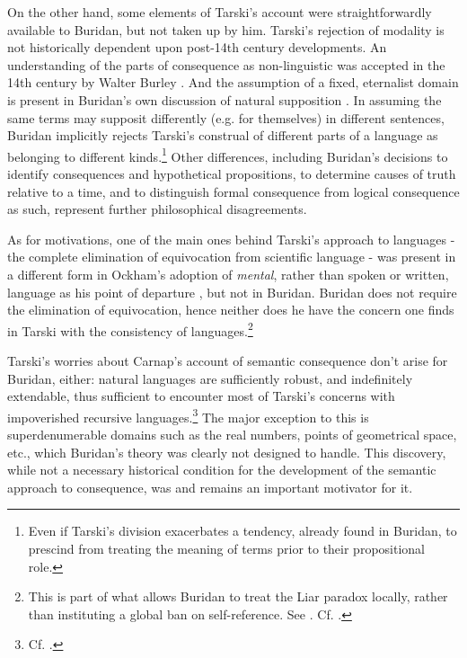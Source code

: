 \documentclass[]{article}
\begin{document}
On the other hand, some elements of Tarski's account were straightforwardly available to Buridan, but not taken up by him. Tarski's rejection of modality is not historically dependent upon post-14th century developments. An understanding of the parts of consequence as non-linguistic was accepted in the 14th century by Walter Burley \autocite{Bulthuis2016}. And the assumption of a fixed, eternalist domain is present in Buridan's own discussion of natural supposition \autocite[4.3.4]{BuridanKlimaSD}. In assuming the same terms may supposit differently (e.g. for themselves) in different sentences, Buridan implicitly rejects Tarski's construal of different parts of a language as belonging to different kinds.\footnote{Even if Tarski's division exacerbates a tendency, already found in Buridan, to prescind from treating the meaning of terms prior to their propositional role.} Other differences, including Buridan's decisions to identify consequences and hypothetical propositions, to determine causes of truth relative to a time, and to distinguish formal consequence from logical consequence as such, represent further philosophical disagreements.

As for motivations, one of the main ones behind Tarski's approach to languages - the complete elimination of equivocation from scientific language - was present in a different form in Ockham's adoption of \textit{mental}, rather than spoken or written, language as his point of departure \autocite{Trentman1970} \autocite{Spade1980} \autocite{Chalmers1999}, but not in Buridan. Buridan does not require the elimination of equivocation, hence neither does he have the concern one finds in Tarski with the consistency of languages.\footnote{This is part of what allows Buridan to treat the Liar paradox locally, rather than instituting a global ban on self-reference. See \autocite[9.2.6]{BuridanKlimaSD}. Cf. \autocite{Klima2004} \autocite{Klima2008} \autocite{DutilhNovaes2011b} \autocite{Benetreau-Dupin2015}.}

Tarski's worries about Carnap's account of semantic consequence don't arise for Buridan, either: natural languages are sufficiently robust, and indefinitely extendable, thus sufficient to encounter most of Tarski's concerns with impoverished recursive languages.\footnote{Cf. \autocite{BarcanMarcus1978}.} The major exception to this is superdenumerable domains such as the real numbers, points of geometrical space, etc., which Buridan's theory was clearly not designed to handle. This discovery, while not a necessary historical condition for the development of the semantic approach to consequence, was and remains an important motivator for it.
\end{document}

